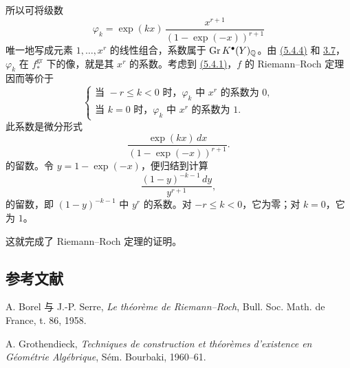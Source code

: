 所以可将级数
\[
\varphi_k=\exp(kx)\,
\frac{x^{r+1}}{(1-\exp(-x))^{r+1}}
\]
唯一地写成元素 \(1,\ldots,x^r\) 的线性组合，系数属于
\(\operatorname{Gr} K^{\bullet}(Y)_{\mathbb Q}\)。由 \hyperlink{sga6.e08.eq.5-4-4}{(5.4.4)} 和 \hyperlink{sga6.e08.prop.3-7}{3.7}，\(\varphi_k\) 在 \(f^{\mathrm{gr}}_*\) 下的像，就是其 \(x^r\) 的系数。考虑到 \hyperlink{sga6.e08.eq.5-4-1}{(5.4.1)}，\(f\) 的 Riemann--Roch 定理因而等价于
\[
\left\{
\begin{array}{ll}
\text{当 }-r\leq k<0\text{ 时，}\varphi_k\text{ 中 }x^r\text{ 的系数为 }0,\\
\text{当 }k=0\text{ 时，}\varphi_k\text{ 中 }x^r\text{ 的系数为 }1.
\end{array}
\right.
\tag{RR}
\]
此系数是微分形式
\[
 \frac{\exp(kx)\,dx}{(1-\exp(-x))^{r+1}}.
\]
的留数。令 \(y=1-\exp(-x)\)，便归结到计算
\[
 \frac{(1-y)^{-k-1}\,dy}{y^{r+1}},
\]
的留数，即 \((1-y)^{-k-1}\) 中 \(y^r\) 的系数。对 \(-r\leq k<0\)，它为零；对 \(k=0\)，它为 \(1\)。

这就完成了 Riemann--Roch 定理的证明。

\subsection*{参考文献}
\begin{enumerate}[label={[\arabic*]}]
\item A. Borel 与 J.-P. Serre, \emph{Le théorème de Riemann--Roch}, Bull. Soc. Math. de France, t. 86, 1958.
\item A. Grothendieck, \emph{Techniques de construction et théorèmes d'existence en Géométrie Algébrique}, Sém. Bourbaki, 1960--61.
\end{enumerate}



